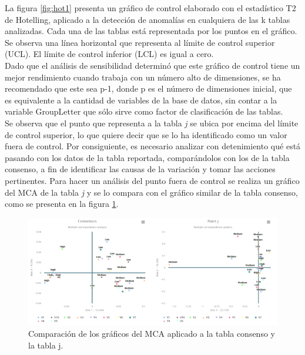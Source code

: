 \documentclass[water,article,submit,moreauthors,pdftex]{mdpi}
\begin{document}
La figura \ref{fig:hot1} presenta un gráfico de control elaborado con el
estadístico T2 de Hotelling, aplicado a la detección de anomalías en
cualquiera de las k tablas analizadas. Cada una de las tablas está
representada por los puntos en el gráfico. Se observa una línea
horizontal que representa al límite de control superior (UCL). El límite
de control inferior (LCL) es igual a cero.\\
Dado que el análisis de sensibilidad determinó que este gráfico de
control tiene un mejor rendimiento cuando trabaja con un número alto de
dimensiones, se ha recomendado que este sea p-1, donde p es el número de
dimensiones inicial, que es equivalente a la cantidad de variables de la
base de datos, sin contar a la variable GroupLetter que sólo sirve como
factor de clasificación de las tablas.\\
Se observa que el punto que representa a la tabla \emph{j} se ubica por
encima del límite de control superior, lo que quiere decir que se lo ha
identificado como un valor fuera de control. Por consiguiente, es
necesario analizar con detenimiento qué está pasando con los datos de la
tabla reportada, comparándolos con los de la tabla consenso, a fin de
identificar las causas de la variación y tomar las acciones pertinentes.
Para hacer un análisis del punto fuera de control se realiza un gráfico
del MCA de la tabla \emph{j} y se lo compara con el gráfico similar de
la tabla consenso, como se presenta en la figura \ref{fig:conspoint}.

\begin{figure}[!ht]



\begin{center}\includegraphics[width=0.6\linewidth,]{conspoint} \end{center}

\caption{Comparación de los gráficos del MCA aplicado a la tabla consenso y la tabla j.}

\label{fig:conspoint}
\end{figure}
\end{document}
